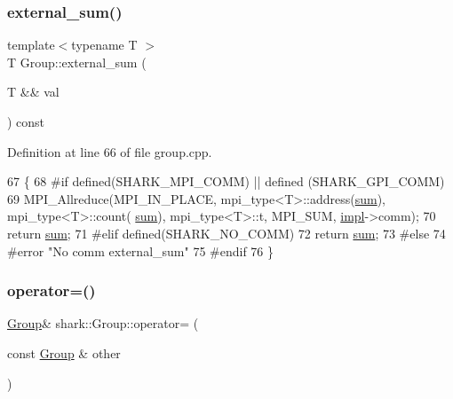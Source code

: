 \subsubsection{\texorpdfstring{external\+\_\+sum()}{external\_sum()}}
{\footnotesize\ttfamily template$<$typename T $>$ \\
T Group\+::external\+\_\+sum (\begin{DoxyParamCaption}\item[{T \&\&}]{val }\end{DoxyParamCaption}) const}



Definition at line 66 of file group.\+cpp.


\begin{DoxyCode}
67 \{
68 \textcolor{preprocessor}{#if defined(SHARK\_MPI\_COMM) || defined (SHARK\_GPI\_COMM)}
69     MPI\_Allreduce(MPI\_IN\_PLACE, mpi\_type<T>::address(\hyperlink{namespaceshark_1_1ndim_a864213068a08615fa12bdd67d83ed324}{sum}), mpi\_type<T>::count(
      \hyperlink{namespaceshark_1_1ndim_a864213068a08615fa12bdd67d83ed324}{sum}), mpi\_type<T>::t, MPI\_SUM, \hyperlink{classshark_1_1_group_a1b1f4345bb3d08df22d32c13bd693580}{impl}->comm);
70     \textcolor{keywordflow}{return} \hyperlink{namespaceshark_1_1ndim_a864213068a08615fa12bdd67d83ed324}{sum};
71 \textcolor{preprocessor}{#elif defined(SHARK\_NO\_COMM)}
72     \textcolor{keywordflow}{return} \hyperlink{namespaceshark_1_1ndim_a864213068a08615fa12bdd67d83ed324}{sum};
73 \textcolor{preprocessor}{#else}
74 \textcolor{preprocessor}{#error "No comm external\_sum"}
75 \textcolor{preprocessor}{#endif}
76 \}
\end{DoxyCode}
\hypertarget{classshark_1_1_group_a6e7729794a54c2046bd939663f601865}{}\label{classshark_1_1_group_a6e7729794a54c2046bd939663f601865} 
\subsubsection{\texorpdfstring{operator=()}{operator=()}}
{\footnotesize\ttfamily \hyperlink{classshark_1_1_group}{Group}\& shark\+::\+Group\+::operator= (\begin{DoxyParamCaption}\item[{const \hyperlink{classshark_1_1_group}{Group} \&}]{other }\end{DoxyParamCaption})\hspace{0.3cm}{\ttfamily [delete]}}

